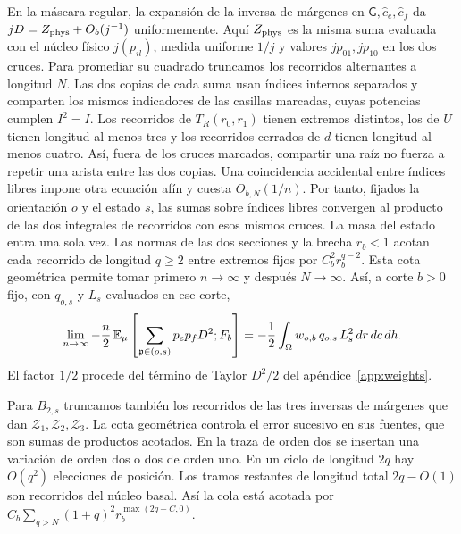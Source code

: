 En la máscara regular, la expansión de la inversa de márgenes en \(\mathsf G,\hat c_e,\hat c_f\)
da \(jD=Z_{\rm phys}+O_b(j^{-1})\) uniformemente. Aquí \(Z_{\rm phys}\) es la misma suma
evaluada con el núcleo físico \(j(p_{il})\), medida uniforme \(1/j\) y valores \(jp_{01},jp_{10}\)
en los dos cruces. Para promediar su cuadrado truncamos los recorridos alternantes a longitud
\(N\). Las dos copias de cada suma usan índices internos separados y comparten los mismos
indicadores de las casillas marcadas, cuyas potencias cumplen \(I^2=I\). Los recorridos de
\(T_R(r_0,r_1)\) tienen extremos distintos, los de \(U\) tienen longitud al menos tres y los
recorridos cerrados de \(d\) tienen longitud al menos cuatro. Así, fuera de los cruces marcados,
compartir una raíz no fuerza a repetir una arista entre las dos copias. Una coincidencia accidental
entre índices libres impone otra ecuación afín y cuesta \(O_{b,N}(1/n)\).
Por tanto, fijados la orientación \(o\) y el estado \(s\), las sumas sobre índices libres
convergen al producto de las dos integrales de recorridos con esos mismos cruces. La masa
del estado entra una sola vez. Las normas de las dos secciones y la brecha
\(r_b<1\) acotan cada recorrido de longitud \(q\ge2\) entre extremos fijos por \(C_b^2r_b^{q-2}\).
Esta cota geométrica permite tomar primero \(n\to\infty\) y después \(N\to\infty\). Así, a
corte \(b>0\) fijo, con \(q_{o,s}\) y \(L_s\) evaluados en ese corte,
\[
 \lim_{n\to\infty}-\frac n2\,\mathbb E_\mu
 \left[\sum_{\mathfrak p\in(o,s)}p_ep_fD^2;F_b\right]
 =-\frac12\int_\Omega w_{o,b}\,q_{o,s}\,L_s^2\,dr\,dc\,dh .
\]
El factor \(1/2\) procede del término de Taylor \(D^2/2\) del apéndice~\ref{app:weights}.

Para \(B_{2,s}\) truncamos también los recorridos de las tres inversas de márgenes que dan
\(\mathcal Z_1,\mathcal Z_2,\mathcal Z_3\). La cota geométrica controla el error sucesivo en sus fuentes,
 que son sumas de
productos acotados. En la traza de orden dos se insertan una variación de orden dos o dos de
orden uno. En un ciclo de longitud \(2q\) hay \(O(q^2)\) elecciones de posición. Los tramos
restantes de longitud total \(2q-O(1)\) son recorridos del núcleo basal. Así la cola está acotada
por \(C_b\sum_{q>N}(1+q)^2r_b^{\max(2q-C,0)}\).

